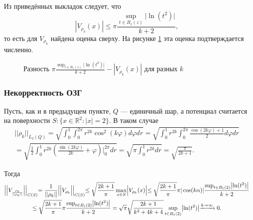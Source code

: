 \documentclass[a4paper, 12pt]{article}
\newcommand{\R}[1]{\mathbb{R}^#1}
\begin{document}
Из приведённых выкладок следует, что 
\begin{equation}
   | V_{\rho_k}(x)| \leq \pi \frac{\sup_{t \in B_1(z)} \bigl| \ln (t^2) \bigl|}{k+2},
\end{equation}
то есть для $V_{\rho_k}$ найдена оценка сверху. На рисунке \ref{chis} эта оценка подтверждается численно.
\begin{figure}[h!]
  \noindent{}
  \caption{Разность $\pi \frac{\sup_{t \in B_1(z)} \bigl| \ln (t^2) \bigl|}{k+2} -| V_{\rho_k}(x)| $ для разных $k$}
  \label{chis}
  \end{figure} 

\subsubsection{Некорректность ОЗГ}
Пусть, как и в предыдущем пункте, $Q$ --- единичный шар, а потенциал считается на поверхности $S: \{x\in \R{2}: |x|=2 \}$. В таком случае
\begin{multline}
    ||\rho_k ||_{L_2(Q)}=\sqrt{\int_0^1 \int_0^{2 \pi} r^{2k} \cos^2(k \varphi) d\varphi dr}= \sqrt{\int_0^1 r^{2k} \int_0^{2 \pi} \frac{\cos(2k \varphi)+1}{2}  d\varphi dr}\\
    =\sqrt{\frac{1}{2} \int_0^1 r^{2k} \left( \frac{\sin(2k \varphi)}{2k} +\varphi\right)\Biggl|_0^{2 \pi} dr}= \sqrt{\pi \int_0^1 r^{2k} dr}=\sqrt{\frac{\pi}{2k+1}}.
\end{multline}

Тогда
\begin{multline}
    \Bigl|\Bigl|V_{\frac{\rho_k}{||\rho_k ||}}  \Bigl|\Bigl|_{C(S)}= \frac{1}{||\rho_k ||} \Bigl|\Bigl|V_{\rho_k}  \Bigl|\Bigl|_{C(S)} \leq \sqrt{\frac{2k+1}{\pi}} \max_{x \in S} \Bigl| V_{\rho_k}(x) \Bigl| \leq \sqrt{\frac{2k+1}{\pi}} \pi |\cos(k\alpha)| \frac{\sup_{t \in B_1(2)} \bigl| \ln (t^2) \bigl|}{k+2} \\
    \leq \sqrt{\frac{2k+1}{\pi}} \pi \frac{\sup_{ t \in B_1(2)} \bigl| \ln (t^2) \bigl|}{k+2} = \sqrt{\pi} \sqrt{\frac{2k+1}{k^2 + 4k+4}}\sup_{t \in B_1(2)} \bigl| \ln (t^2) \bigl| \xrightarrow{k \rightarrow \infty} 0.
\end{multline}
\end{document}
